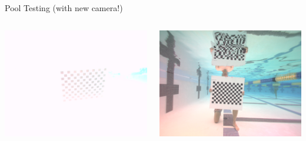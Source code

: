 \begin{frame}{Pool Testing (with new camera!)}
    \begin{columns}[c]
        \centering
        \includegraphics[width=\linewidth]{images/frame_00137.png}
        
        \centering
        \includegraphics[width=\linewidth]{images/frame_02595.png}
        

\end{columns}
\end{frame}
